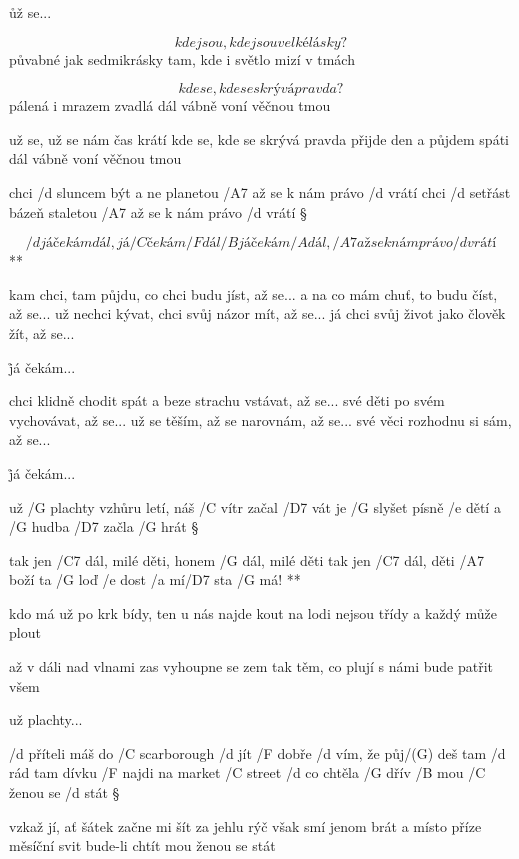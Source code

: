 \r už se...

\[ kde jsou, kde jsou velké lásky? \]
půvabné jak sedmikrásky
tam, kde i světlo mizí v tmách \s

\[ kde se, kde se skrývá pravda? \]
pálená i mrazem zvadlá
dál vábně voní věčnou tmou \s

už se, už se nám čas krátí
kde se, kde se skrývá pravda
přijde den a půjdem spáti
dál vábně voní věčnou tmou




chci /d sluncem být a ne planetou
/A7 až se k nám právo /d vrátí
chci /d setřást bázeň staletou
/A7 až se k nám právo /d vrátí \S

\R \[ /d já čekám dál, já /C čekám /F dál
   /B já čekám /A dál, /A7 až se k nám právo /d vrátí \]**

kam chci, tam půjdu, co chci budu jíst, až se...
a na co mám chuť, to budu číst, až se...
už nechci kývat, chci svůj názor mít, až se...
já chci svůj život jako člověk žít, až se... \s

\r já čekám...

chci klidně chodit spát a beze strachu vstávat, až se...
své děti po svém vychovávat, až se...
už se těším, až se narovnám, až se...
své věci rozhodnu si sám, až se... \s

\r já čekám...




už /G plachty vzhůru letí, náš /C vítr začal /D7 vát
je /G slyšet písně /e dětí a /G hudba /D7 začla /G hrát \S

\R tak jen /C7 dál, milé děti, honem /G dál, milé děti
   tak jen /C7 dál, děti /A7 boží
   ta /G loď /e dost /a mí/D7 sta /G má! **

kdo má už po krk bídy, ten u nás najde kout
na lodi nejsou třídy a každý může plout \s

až v dáli nad vlnami zas vyhoupne se zem
tak těm, co plují s námi bude patřit všem \s

už plachty...




/d příteli máš do /C scarborough /d jít
/F dobře /d vím, že půj/(G) deš tam /d rád
tam dívku /F najdi na market /C street
/d co chtěla /G dřív /B mou /C ženou se /d stát \S

vzkaž jí, ať šátek začne mi šít
za jehlu rýč však smí jenom brát
a místo příze měsíční svit
bude-li chtít mou ženou se stát \s

